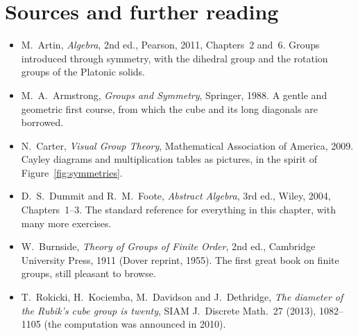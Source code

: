 \section*{Sources and further reading}

\begin{itemize}
\item M.~Artin, \emph{Algebra}, 2nd ed., Pearson, 2011, Chapters~2 and~6. Groups introduced through symmetry, with the dihedral group and the rotation groups of the Platonic solids.
\item M.~A.~Armstrong, \emph{Groups and Symmetry}, Springer, 1988. A gentle and geometric first course, from which the cube and its long diagonals are borrowed.
\item N.~Carter, \emph{Visual Group Theory}, Mathematical Association of America, 2009. Cayley diagrams and multiplication tables as pictures, in the spirit of Figure~\ref{fig:symmetries}.
\item D.~S.~Dummit and R.~M.~Foote, \emph{Abstract Algebra}, 3rd ed., Wiley, 2004, Chapters~1--3. The standard reference for everything in this chapter, with many more exercises.
\item W.~Burnside, \emph{Theory of Groups of Finite Order}, 2nd ed., Cambridge University Press, 1911 (Dover reprint, 1955). The first great book on finite groups, still pleasant to browse.
\item T.~Rokicki, H.~Kociemba, M.~Davidson and J.~Dethridge, \emph{The diameter of the Rubik's cube group is twenty}, SIAM J.\ Discrete Math.\ 27 (2013), 1082--1105 (the computation was announced in 2010).
\end{itemize}
